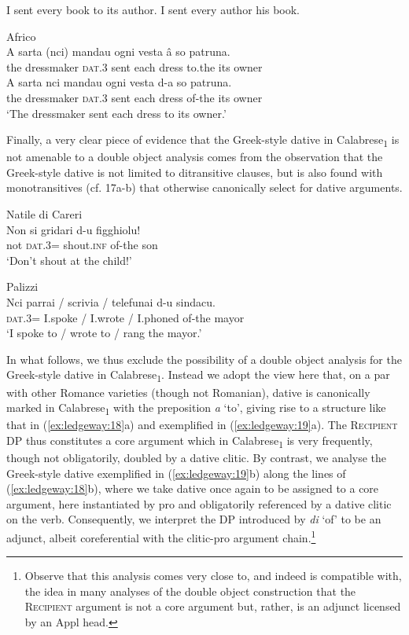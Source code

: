 \documentclass[output=paper,modfonts,nonflat,colorlinks,citecolor=brown]{langsci/langscibook}
\begin{document}
\ea\label{ex:ledgeway:15}
\ea I sent every book to its author.  
\ex I sent every author his book.
\z
\z

\ea\label{ex:ledgeway:16}
  Africo\\
\ea
	\gll A  sarta  (nci)  mandau  ogni  vesta  â  so patruna.\\
      the  dressmaker  \textsc{dat}.3  sent  each  dress  to.the  its  owner\\
\ex
	\gll A  sarta  nci  mandau  ogni  vesta  d-a  so patruna.\\
      the  dressmaker  \textsc{dat}.3  sent  each  dress  of-the  its     owner\\
      \glt `The dressmaker sent each dress to its owner.'
      \z
      \z

Finally, a very clear piece of evidence that the Greek-style dative in Calabrese\textsubscript{1} is not amenable to a double object analysis comes from the observation that the Greek-style dative is not limited to ditransitive clauses, but is also found with monotransitives (cf. 17a-b) that otherwise canonically select for dative arguments.

\ea\label{ex:ledgeway:17}
\ea Natile di Careri\\
 \gll Non  si  gridari  d-u  figghiolu!\\
    not  \textsc{dat}.3=  shout.\textsc{inf}  of-the  son\\
     \glt `Don’t shout at the child!'

\ex Palizzi  \\
    \gll Nci  parrai / scrivia / telefunai d-u sindacu.\\
    \textsc{dat}.3= I.spoke / I.wrote / I.phoned of-the mayor\\
    \glt `I spoke to / wrote to / rang the mayor.'
    \z
    \z

In what follows, we thus exclude the possibility of a double object analysis for the Greek-style dative in Calabrese\textsubscript{1}. Instead we adopt the view here that, on a par with other Romance varieties (though not Romanian), dative is canonically marked in Calabrese\textsubscript{1} with the preposition \textit{a} ‘to’, giving rise to a structure like that in (\ref{ex:ledgeway:18}a) and exemplified in (\ref{ex:ledgeway:19}a). The \textsc{Recipient} DP thus constitutes a core argument which in Calabrese\textsubscript{1} is very frequently, though not obligatorily, doubled by a dative clitic. By contrast, we analyse the Greek-style dative exemplified in (\ref{ex:ledgeway:19}b) along the lines of (\ref{ex:ledgeway:18}b), where we take dative once again to be assigned to a core argument, here instantiated by pro and obligatorily referenced by a dative clitic on the verb. Consequently, we interpret the DP introduced by \textit{di} ‘of’ to be an adjunct, albeit coreferential with the clitic-pro argument chain.\footnote{Observe that this analysis comes very close to, and indeed is compatible with, the idea in many analyses of the double object construction that the \textsc{Recipient} argument is not a core argument but, rather, is an adjunct licensed by an Appl head.} 
\end{document}
